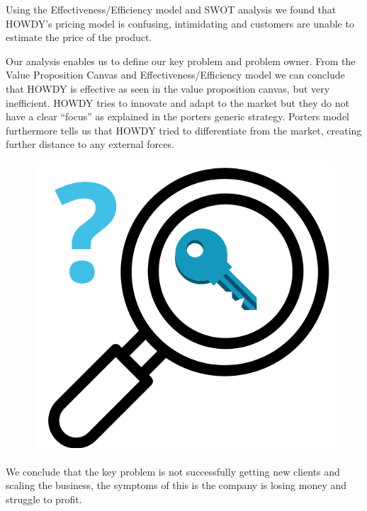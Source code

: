 Using the Effectiveness/Efficiency model and SWOT analysis we found that HOWDY’s pricing model is confusing, intimidating and customers are unable to estimate the price of the product.

Our analysis enables us to define our key problem and problem owner. From the Value Proposition Canvas and Effectiveness/Efficiency model we can conclude that HOWDY is effective as seen in the value proposition canvas, but very inefficient. HOWDY tries to innovate and adapt to the market but they do not have a clear “focus” as explained in the porters generic strategy. Porters model furthermore tells us that HOWDY tried to differentiate from the market, creating further distance to any external forces\cite[p.190]{jones_george_2013}.

\begin{figure}
\centering
\includegraphics[scale=0.15]{figures/keyproblem.png}
\end{figure}
\paragraph{}

We conclude that the key problem is not successfully getting new clients and scaling the business, the symptoms of this is the company is losing money and struggle to profit.

